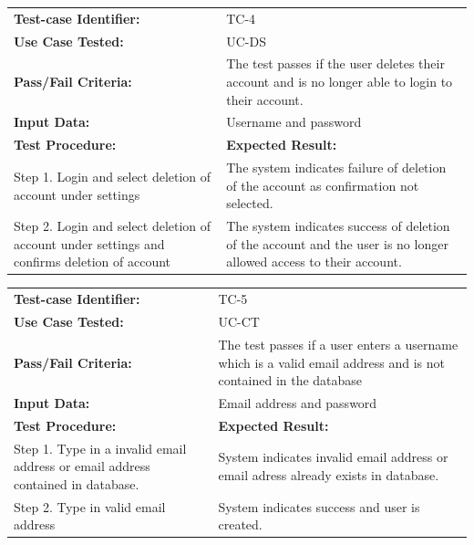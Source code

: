 \documentclass[12pt]{article}
\begin{document}
\begin{tabular}{| p{8cm} | p{8cm} |} \hline
	\textbf{Test-case Identifier:}& TC-4\\
	\textbf{Use Case Tested:}& UC-DS\\
	\textbf{Pass/Fail Criteria:}& The test passes if the user deletes their account and is no longer able to login to their account.\\
	\textbf{Input Data:}& Username and password\\\hline
	\textbf{Test Procedure:}& \textbf{Expected Result:} \\\hline
	Step 1. Login and select deletion of account under settings & The system indicates failure of deletion of the account as confirmation not selected. \\
	Step 2. Login and select deletion of account under settings and confirms deletion of account& The system indicates success of deletion of the account and the user is no longer allowed access to their account.\\
		\hline
\end{tabular}

\begin{tabular}{| p{8cm} | p{8cm} |} \hline
	\textbf{Test-case Identifier:}& TC-5\\
	\textbf{Use Case Tested:}& UC-CT\\
	\textbf{Pass/Fail Criteria:}& The test passes if a user enters a username which is a valid email address
	and is not contained in the database\\
	\textbf{Input Data:}& Email address and password\\\hline
	\textbf{Test Procedure:}& \textbf{Expected Result:} \\\hline
	Step 1. Type in a invalid email address or email address contained in database.
	& System indicates invalid email address or email adress already exists in database.\\
	Step 2. Type in valid email address  & System indicates success and user is created.\\\hline
\end{tabular}
\\
\end{document}
